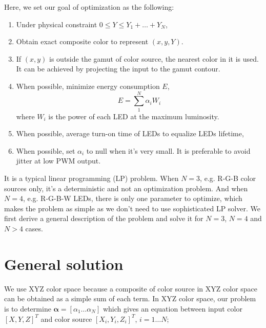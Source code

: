 \documentclass[dvipdfmx,uplatex,a4paper]{article}
\begin{document}
Here, we set our goal of optimization as the following:
\begin{enumerate}
  \item\label{I_max_luminance} Under physical constraint $0 \leq Y \leq  Y_1 + \ldots + Y_N$,
  \item\label{I_solution} Obtain exact composite color to represent $(x, y, Y)$.
  \item\label{I_inside_gamut} If $(x, y)$ is outside the gamut of color source, the nearest color in it is used.
  It can be achieved by projecting the input to the gamut contour.
  \item\label{I_min_energy} When possible, minimize energy consumption $E$, \\
  \begin{equation}
    \label{E_min_energy}
    E = \sum_1^N \alpha_i W_i
  \end{equation}
  where $W_i$ is the power of each LED at the maximum luminosity.
  \item\label{I_lifetime} When possible, average turn-on time of LEDs to equalize LEDs lifetime,
  \item\label{I_small_alpha} When possible, set $\alpha_i$ to null when it's very small.
  It is preferable to avoid jitter at low PWM output.
\end{enumerate}

It is a typical linear programming (LP) problem. When $N=3$, e.g. R-G-B color sources only, it's a deterministic and not an optimization problem. And when $N=4$, e.g. R-G-B-W LEDs, there is only one parameter to optimize, which makes the problem as simple as we don't need to use sophisticated LP solver.
We first derive a general description of the problem and solve it for $N=3$, $N=4$ and $N > 4$ cases.

\section{General solution}
We use XYZ color space because a composite of color source in XYZ color space can be obtained as a simple sum of each term.  In XYZ color space, our problem is to determine $\boldsymbol{\alpha} = [\alpha_1 \ldots \alpha_N]$ which gives an equation between input color $[X, Y, Z]^T$ and color source $[X_{i}, Y_{i}, Z_{i}]^T$, $i=1 \ldots N$;
\end{document}
